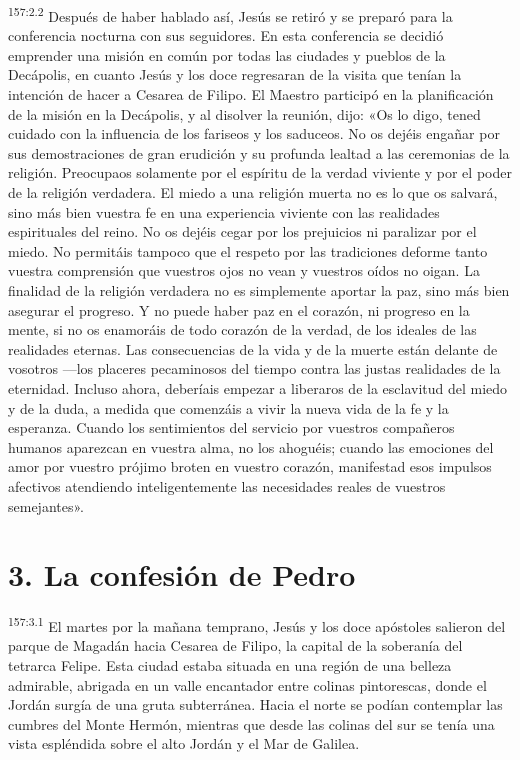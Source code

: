 \par 
\textsuperscript{157:2.2} Después de haber hablado así, Jesús se retiró y se preparó para la conferencia nocturna con sus seguidores. En esta conferencia se decidió emprender una misión en común por todas las ciudades y pueblos de la Decápolis, en cuanto Jesús y los doce regresaran de la visita que tenían la intención de hacer a Cesarea de Filipo. El Maestro participó en la planificación de la misión en la Decápolis, y al disolver la reunión, dijo: «Os lo digo, tened cuidado con la influencia de los fariseos y los saduceos. No os dejéis engañar por sus demostraciones de gran erudición y su profunda lealtad a las ceremonias de la religión. Preocupaos solamente por el espíritu de la verdad viviente y por el poder de la religión verdadera. El miedo a una religión muerta no es lo que os salvará, sino más bien vuestra fe en una experiencia viviente con las realidades espirituales del reino. No os dejéis cegar por los prejuicios ni paralizar por el miedo. No permitáis tampoco que el respeto por las tradiciones deforme tanto vuestra comprensión que vuestros ojos no vean y vuestros oídos no oigan. La finalidad de la religión verdadera no es simplemente aportar la paz, sino más bien asegurar el progreso. Y no puede haber paz en el corazón, ni progreso en la mente, si no os enamoráis de todo corazón de la verdad, de los ideales de las realidades eternas. Las consecuencias de la vida y de la muerte están delante de vosotros ---los placeres pecaminosos del tiempo contra las justas realidades de la eternidad. Incluso ahora, deberíais empezar a liberaros de la esclavitud del miedo y de la duda, a medida que comenzáis a vivir la nueva vida de la fe y la esperanza. Cuando los sentimientos del servicio por vuestros compañeros humanos aparezcan en vuestra alma, no los ahoguéis; cuando las emociones del amor por vuestro prójimo broten en vuestro corazón, manifestad esos impulsos afectivos atendiendo inteligentemente las necesidades reales de vuestros semejantes».

\section*{3. La confesión de Pedro}
\par 
\textsuperscript{157:3.1} El martes por la mañana temprano, Jesús y los doce apóstoles salieron del parque de Magadán hacia Cesarea de Filipo, la capital de la soberanía del tetrarca Felipe. Esta ciudad estaba situada en una región de una belleza admirable, abrigada en un valle encantador entre colinas pintorescas, donde el Jordán surgía de una gruta subterránea. Hacia el norte se podían contemplar las cumbres del Monte Hermón, mientras que desde las colinas del sur se tenía una vista espléndida sobre el alto Jordán y el Mar de Galilea.

